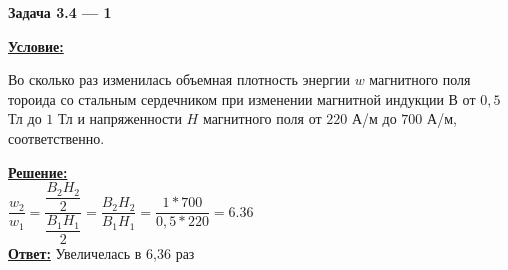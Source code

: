 
\begin{center}
    \textbf{Задача 3.4 --- 1}
\end{center}

\underline{\textbf{Условие:}}

Во сколько раз изменилась объемная плотность энергии 
$ w $ магнитного поля тороида со 
стальным сердечником при изменении магнитной индукции 
$ В $ от $ 0,5 $ Тл до $ 1 $ Тл и напряженности 
$ H $ магнитного поля от 
$ 220 $ А/м до $ 700 $ А/м, соответственно.

\underline{\textbf{Решение:}}\\


$ \dfrac{w_2}{w_1} = \dfrac{\dfrac{B_2H_2}{2}}{\dfrac{B_1H_1}{2}} = 
\dfrac{B_2H_2}{B_1H_1} = 
\dfrac{1 * 700}{0,5 * 220} = 
6.36
$
\\

\underline{\textbf{Ответ:}}
Увеличелась в 6,36 раз

